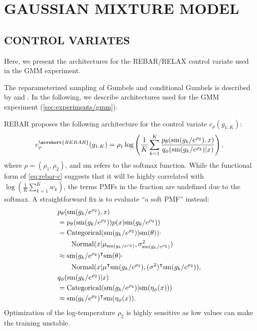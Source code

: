 \section{GAUSSIAN MIXTURE MODEL}
\label{app:gmm}

\subsection{CONTROL VARIATES}
Here, we present the architectures for the \acrshort{REBAR}/\acrshort{RELAX} control variate used in the \gls{GMM} experiment.

The reparameterized sampling of Gumbels and conditional Gumbels is described by \citet[Appendix C]{tucker2017rebar} and \citet[Appendix B]{grathwohl2018backpropagation}.
In the following, we describe architectures used for the \gls{GMM} experiment (\cref{sec:experiments/gmm}).

\Acrshort{REBAR} proposes the following architecture for the control variate $c_\rho(g_{1:K})$:
\begin{align}
    c_\rho^{\acrshort{REBAR}}(g_{1:K}) = \rho_1 \log\left(\frac{1}{K} \sum_{k = 1}^K \frac{p_\theta(\mathrm{sm}(g_k / e^{\rho_2}), x)}{q_\phi(\mathrm{sm}(g_k / e^{\rho_2}) \given x)}\right), \label{eq:rebar-c}
\end{align}
where $\rho = (\rho_1, \rho_2)$, and $\mathrm{sm}$ refers to the softmax function.
While the functional form of \cref{eq:rebar-c} suggests that it will be highly correlated with $\log(\frac{1}{K} \sum_{k = 1}^K w_k)$, the terms \glspl{PMF} in the fraction are undefined due to the softmax.
A straightforward fix is to evaluate ``a soft \gls{PMF}'' instead:
\begin{align*}
    &p_\theta(\mathrm{sm}(g_k / e^{\rho_2}), x) \\
    &= p_\theta(\mathrm{sm}(g_k / e^{\rho_2})) p(x \lvert \mathrm{sm}(g_k / e^{\rho_2})) \\
    &= \mathrm{Categorical}(\mathrm{sm}(g_k / e^{\rho_2}) \lvert \mathrm{sm}(\theta)) \cdot \\
    & \qquad\mathrm{Normal}(x \lvert \mu_{\mathrm{sm}(g_k / e^{\rho_2})}, \sigma_{\mathrm{sm}(g_k / e^{\rho_2})}^2) \\
    &\approx  \mathrm{sm}(g_k / e^{\rho_2})^\intercal \mathrm{sm}(\theta) \cdot \\
    & \qquad \mathrm{Normal}(x \lvert \mu^\intercal \mathrm{sm}(g_k / e^{\rho_2}), (\sigma^2)^\intercal \mathrm{sm}(g_k / e^{\rho_2})), \\
    &q_\phi(\mathrm{sm}(g_k / e^{\rho_2}) \lvert x) \\
    &= \mathrm{Categorical}(\mathrm{sm}(g_k / e^{\rho_2}) \lvert \mathrm{sm}(\eta_\phi(x))) \\
    &\approx \mathrm{sm}(g_k / e^{\rho_2})^\intercal \mathrm{sm}(\eta_\phi(x)).
\end{align*}
Optimization of the log-temperature $\rho_2$ is highly sensitive as low values can make the training unstable.

